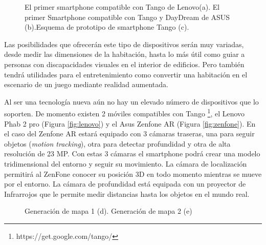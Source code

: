 \begin {enumerate}
\begin{figure}[htbp]
\begin{center}
\hspace{0.5cm}
\end{center}
\caption{El primer smartphone compatible con Tango de Lenovo(a). El primer Smartphone compatible con Tango y DayDream de ASUS (b).Esquema de prototipo de smartphone Tango (c).}
\end{figure}
Las posibilidades que ofrecerán este tipo de dispositivos serán muy variadas, desde medir las dimensiones de la habitación, hasta lo más útil como guiar a personas con discapacidades visuales en el interior de edificios. Pero también tendrá utilidades para el entretenimiento como convertir una habitación en el escenario de un juego mediante realidad aumentada.

Al ser una tecnología nueva aún no hay un elevado número de dispositivos que lo soporten. De momento existen 2 móviles compatibles con Tango \footnote{https://get.google.com/tango/}, el Lenovo  Phab 2 pro (Figura \ref{fig:lenovo}) y el Asus Zenfone AR (Figura \ref{fig:zenfone}).
En el caso del Zenfone AR  estará equipado con 3 cámaras traseras, una para seguir objetos (\textit{motion tracking}), otra para detectar profundidad y otra de alta resolución de 23 MP.
Con estas 3 cámaras el smartphone podrá crear una modelo tridimensional del entorno y seguir su movimiento. La cámara de localización permitirá al ZenFone conocer su posición 3D en todo momento mientras se mueve por el entorno. La cámara de profundidad está equipada con un proyector de Infrarrojos que le permite medir distancias hasta los objetos en el mundo real.

\begin{figure}[htbp]
\begin{center}
\hspace{0.5cm}
\end{center}
\caption{Generación de mapa 1 (d). Generación de mapa 2 (e)}
\end{figure}


\end{enumerate}
